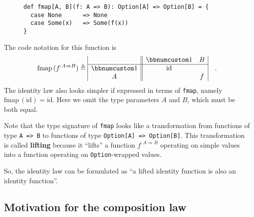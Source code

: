 \begin{wrapfigure}{l}{0.55\columnwidth}%
\vspace{-0.5\baselineskip}
\begin{lstlisting}
def fmap[A, B](f: A => B): Option[A] => Option[B] = {
  case None      => None
  case Some(x)   => Some(f(x))
}
\end{lstlisting}
\vspace{-2\baselineskip}
\end{wrapfigure}%
The code notation for this function is
\begin{equation}
\text{fmap}\,(f^{:A\Rightarrow B})\triangleq\begin{array}{|c||cc|}
 & \bbnum 1 & B\\
\hline \bbnum 1 & \text{id} & \\
A &  & f
\end{array}\quad.\label{eq:f-def-opt-fmap-matrix-notation}
\end{equation}
The identity law also looks simpler if expressed in terms of \lstinline!fmap!,
namely $\text{fmap}\,(\text{id})=\text{id}$. Here we omit the type
parameters $A$ and $B$, which must be both equal.

Note that the type signature of \lstinline!fmap! looks like a transformation
from functions of type \lstinline!A => B! to functions of type \lstinline!Option[A] => Option[B]!.
This transformation is called \textbf{lifting} because
it ``lifts'' a function $f^{:A\Rightarrow B}$ operating on simple
values into a function operating on \lstinline!Option!-wrapped values. 

So, the identity law can be formulated as ``a lifted identity function
is also an identity function''.

\subsection{Motivation for the composition law}

